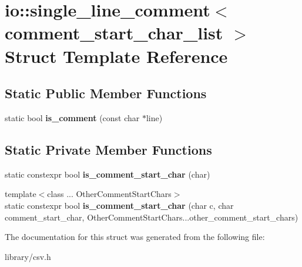 \hypertarget{structio_1_1single__line__comment}{}\section{io\+:\+:single\+\_\+line\+\_\+comment$<$ comment\+\_\+start\+\_\+char\+\_\+list $>$ Struct Template Reference}
\label{structio_1_1single__line__comment}
\subsection*{Static Public Member Functions}
\begin{DoxyCompactItemize}
\item 
\mbox{\label{structio_1_1single__line__comment_ac4b029bb0efd251505f8e610cc308a92}} 
static bool {\bfseries is\+\_\+comment} (const char $\ast$line)
\end{DoxyCompactItemize}
\subsection*{Static Private Member Functions}
\begin{DoxyCompactItemize}
\item 
\mbox{\label{structio_1_1single__line__comment_a961a1b5c85dd2ec717ff483cb2206ade}} 
static constexpr bool {\bfseries is\+\_\+comment\+\_\+start\+\_\+char} (char)
\item 
\mbox{\label{structio_1_1single__line__comment_a9533453f729d2216f52af087e4411548}} 
{\footnotesize template$<$class ... Other\+Comment\+Start\+Chars$>$ }\\static constexpr bool {\bfseries is\+\_\+comment\+\_\+start\+\_\+char} (char c, char comment\+\_\+start\+\_\+char, Other\+Comment\+Start\+Chars...\+other\+\_\+comment\+\_\+start\+\_\+chars)
\end{DoxyCompactItemize}


The documentation for this struct was generated from the following file\+:\begin{DoxyCompactItemize}
\item 
library/csv.\+h\end{DoxyCompactItemize}
